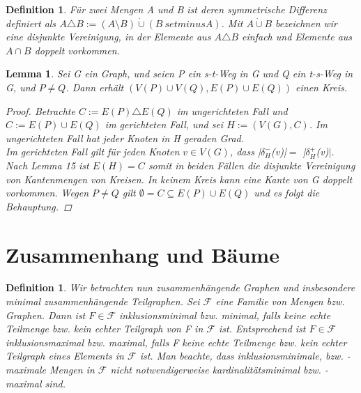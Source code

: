 \documentclass{article}
\newtheorem{definition}[satz]{Definition}
\newtheorem{lemma}[satz]{Lemma}
\begin{document}
  \begin{definition} \lable
    Für zwei Mengen A und B ist deren symmetrische Differenz definiert als $A\triangle B:= (A\setminus B) \dot\cup (B\ setminus A)$.
    Mit $A\dot\cup B$ bezeichnen wir eine disjunkte Vereinigung, in der Elemente aus $A\triangle B$ einfach und Elemente aus $A \cap B$ doppelt vorkommen.
  \end{definition}
  \vspace{\baselineskip}
 
  \begin{lemma}\lable
    Sei G ein Graph, und seien P ein s-t-Weg in G und Q ein t-s-Weg in G, und $P\neq Q$.
    Dann erhält $(V(P)\cup V(Q), E(P) \cup E(Q))$ einen Kreis.
    \begin{proof}
      Betrachte $C:=E(P)\triangle E(Q)$ im ungerichteten Fall und $C:=E(P)\cup E(Q)$ im gerichteten Fall, und sei $H:= (V(G),C)$.
      Im ungerichteten Fall hat jeder Knoten in H geraden Grad.\\
      Im gerichteten Fall gilt für jeden Knoten $v\in V(G)$, dass |$\delta^-_H$(v)|$ =$ |$\delta^+_H$(v)$|$.
      Nach Lemma 15 ist $E(H)= C$ somit in beiden Fällen die disjunkte Vereinigung von Kantenmengen von Kreisen.
      In keinem Kreis kann eine Kante von G doppelt vorkommen.
      Wegen $P\neq Q$ gilt $\emptyset= C\subseteq E(P)\cup E(Q)$ und es folgt die Behauptung.
    \end{proof}
  \end{lemma}
  \vspace{\baselineskip}
\newpage

\section{Zusammenhang und Bäume}
 \begin{definition} \lable
   Wir betrachten nun zusammenhängende Graphen und insbesondere minimal zusammenhängende Teilgraphen.
    Sei $\mathcal{F}$ eine Familie von Mengen bzw. Graphen. 
    Dann ist $F \in\mathcal{F}$ inklusionsminimal bzw. minimal, falls keine echte Teilmenge bzw. kein echter Teilgraph von F in $\mathcal{F}$ ist.
    Entsprechend ist $F \in \mathcal{F}$ inklusionsmaximal bzw. maximal, falls F keine echte Teilmenge bzw. kein echter Teilgraph eines Elements in $\mathcal{F}$ ist.
    Man beachte, dass inklusionsminimale, bzw. -maximale Mengen in $\mathcal{F}$ nicht notwendigerweise kardinalitätsminimal bzw. -maximal sind.
    \end{definition}
    \vspace{\baselineskip}
\end{document}
